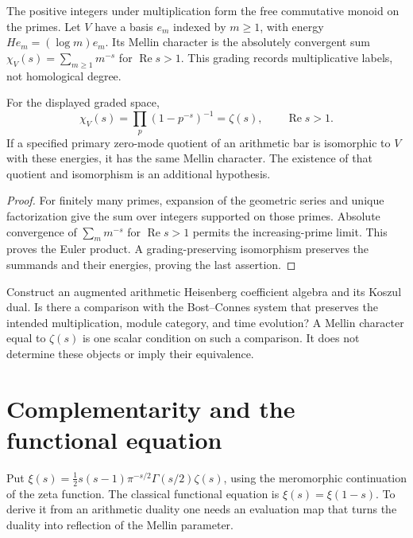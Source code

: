 The positive integers under multiplication form the free commutative
monoid on the primes. Let \(V\) have a basis \(e_m\) indexed by
\(m\geq1\), with energy \(He_m=(\log m)e_m\).
Its Mellin character is the absolutely convergent sum
\(\chi_V(s)=\sum_{m\geq1}m^{-s}\) for \(\operatorname{Re}s>1\).
This grading records multiplicative labels, not homological degree.

\begin{theorem}
\label{v4-arith:thm:heisenberg-bar-zeta}
For the displayed graded space,
\[
 \chi_V(s)=\prod_p(1-p^{-s})^{-1}=\zeta(s),
 \qquad \operatorname{Re}s>1.
\]
If a specified primary zero-mode quotient of an arithmetic bar is
isomorphic to \(V\) with these energies, it has the same Mellin
character. The existence of that quotient and isomorphism is an
additional hypothesis.
\end{theorem}
\begin{proof}
For finitely many primes, expansion of the geometric series and
unique factorization give the sum over integers supported on those
primes. Absolute convergence of \(\sum_m m^{-s}\) for
\(\operatorname{Re}s>1\) permits the increasing-prime limit.
This proves the Euler product. A grading-preserving isomorphism
preserves the summands and their energies, proving the last assertion.
\end{proof}

\begin{question}
\label{v4-arith:cor:koszul-dual-BC}
Construct an augmented arithmetic Heisenberg coefficient algebra and
its Koszul dual. Is there a comparison with the Bost--Connes system
that preserves the intended multiplication, module category, and time
evolution? A Mellin character equal to \(\zeta(s)\) is one scalar
condition on such a comparison. It does not determine these objects
or imply their equivalence.
\end{question}

\section{Complementarity and the functional equation}
\label{v4-arith:bar:G-row-complementarity}

Put \(\xi(s)=\tfrac12s(s-1)\pi^{-s/2}\Gamma(s/2)\zeta(s)\),
using the meromorphic continuation of the zeta function. The classical
functional equation is \(\xi(s)=\xi(1-s)\).
To derive it from an arithmetic duality one needs an evaluation map
that turns the duality into reflection of the Mellin parameter.

